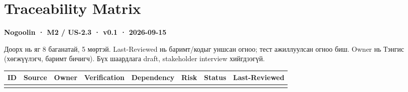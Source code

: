 \section{Traceability Matrix}\label{doc5-traceability-matrix}

\textbf{Nogoolin · M2 / US-2.3 · v0.1 · 2026-09-15}

Доорх нь яг 8 баганатай, 5 мөртэй. Last-Reviewed нь баримт/кодыг уншсан
огноо; тест ажиллуулсан огноо биш. Owner нь Тэнгис (хөгжүүлэгч, баримт
бичигч). Бүх шаардлага draft, stakeholder interview хийгдээгүй.

\begin{longtable}[]{@{}
  >{\raggedright\arraybackslash}p{}
  >{\raggedright\arraybackslash}p{}
  >{\raggedright\arraybackslash}p{}
  >{\raggedright\arraybackslash}p{}
  >{\raggedright\arraybackslash}p{}
  >{\raggedright\arraybackslash}p{}
  >{\raggedright\arraybackslash}p{}
  >{\raggedright\arraybackslash}p{}@{}}
\toprule\noalign{}
\begin{minipage}[b]{\linewidth}\raggedright
ID
\end{minipage} & \begin{minipage}[b]{\linewidth}\raggedright
Source
\end{minipage} & \begin{minipage}[b]{\linewidth}\raggedright
Owner
\end{minipage} & \begin{minipage}[b]{\linewidth}\raggedright
Verification
\end{minipage} & \begin{minipage}[b]{\linewidth}\raggedright
Dependency
\end{minipage} & \begin{minipage}[b]{\linewidth}\raggedright
Risk
\end{minipage} & \begin{minipage}[b]{\linewidth}\raggedright
Status
\end{minipage} & \begin{minipage}[b]{\linewidth}\raggedright
Last-Reviewed
\end{minipage} \\
\midrule\noalign{}
\endhead
\bottomrule\noalign{}

\end{longtable}
